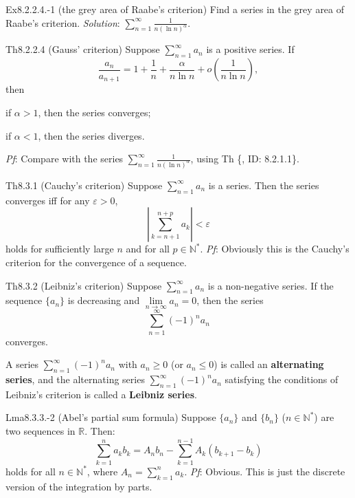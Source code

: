 \documentclass{article}
\begin{document}
\begin{Th}{Ex8.2.2.4.-1 (the grey area of Raabe's criterion)}
    Find a series in the grey area of Raabe's criterion.
    \tcblower
    \textit{Solution}: $\sum_{n=1}^{\infty} \frac{1}{n(\ln n)^\alpha}$.
\end{Th}

\begin{Th}{Th8.2.2.4 (Gauss' criterion)}
    Suppose $\sum_{n=1}^{\infty} a_n$ is a positive series. If
    $$ \frac{a_n}{a_{n+1}} = 1 + \frac{1}{n} + \frac{\alpha}{n\ln n} + o\left(\frac{1}{n\ln n}\right), $$
    then
    \begin{compactenum}
        \item if $\alpha > 1$, then the series converges;
        \item if $\alpha < 1$, then the series diverges.
    \end{compactenum}
    \tcblower
    \textit{Pf}: Compare with the series $\sum_{n=1}^{\infty} \frac{1}{n(\ln n)^\alpha}$, using Th \{, ID: 8.2.1.1\}.
\end{Th}

\begin{Th}{Th8.3.1 (Cauchy's criterion)}
    Suppose $\sum_{n=1}^{\infty} a_n$ is a series. Then the series converges iff for any $\varepsilon>0$, 
    $$ \left|\sum_{k=n+1}^{n+p} a_k\right| < \varepsilon $$
    holds for sufficiently large $n$ and for all $p\in\mathbb{N}^\ast$.
    \tcblower
    \textit{Pf}: Obviously this is the Cauchy's criterion for the convergence of a sequence.
\end{Th}

\begin{Th}{Th8.3.2 (Leibniz's criterion)}
    Suppose $\sum_{n=1}^{\infty} a_n$ is a non-negative series. If the sequence $\{a_n\}$ is decreasing and $\lim\limits_{n\to\infty} a_n = 0$, then the series
    $$ \sum_{n=1}^{\infty} (-1)^{n} a_n $$
    converges.
\end{Th}

\begin{Rmk}{}
    \textcolor{Df}{A series $\sum_{n=1}^{\infty} (-1)^n a_n$ with $a_n\geq 0$ (or $a_n\leq 0$) is called an \textbf{alternating series}, and the alternating series $\sum_{n=1}^{\infty} (-1)^n a_n$ satisfying the conditions of Leibniz's criterion is called a \textbf{Leibniz series}.}
\end{Rmk}

\begin{Th}{Lma8.3.3.-2 (Abel's partial sum formula)}
    Suppose $\{a_n\}$ and $\{b_n\}$ ($n\in\mathbb{N}^\ast$) are two sequences in $\mathbb{R}$. Then:
    $$ \sum_{k=1}^{n} a_k b_k = A_n b_n - \sum_{k=1}^{n-1} A_k(b_{k+1}-b_k) $$
    holds for all $n\in\mathbb{N}^\ast$, where $A_n = \sum_{k=1}^{n} a_k$.
    \tcblower
    \textit{Pf}: Obvious. This is just the discrete version of the integration by parts.
\end{Th}
\end{document}

